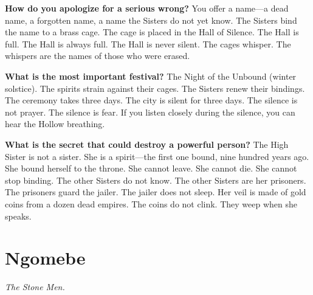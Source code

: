 \begin{almanac}
\textbf{How do you apologize for a serious wrong?} You offer a name---a dead name, a forgotten name, a name the Sisters do not yet know. The Sisters bind the name to a brass cage. The cage is placed in the Hall of Silence. The Hall is full. The Hall is always full. The Hall is never silent. The cages whisper. The whispers are the names of those who were erased.

\textbf{What is the most important festival?} The Night of the Unbound (winter solstice). The spirits strain against their cages. The Sisters renew their bindings. The ceremony takes three days. The city is silent for three days. The silence is not prayer. The silence is fear. If you listen closely during the silence, you can hear the Hollow breathing.

\textbf{What is the secret that could destroy a powerful person?} The High Sister is not a sister. She is a spirit---the first one bound, nine hundred years ago. She bound herself to the throne. She cannot leave. She cannot die. She cannot stop binding. The other Sisters do not know. The other Sisters are her prisoners. The prisoners guard the jailer. The jailer does not sleep. Her veil is made of gold coins from a dozen dead empires. The coins do not clink. They weep when she speaks.
\end{almanac}

\newpage

\newpage

\chapter{Ngomebe}
\emph{The Stone Men.}

